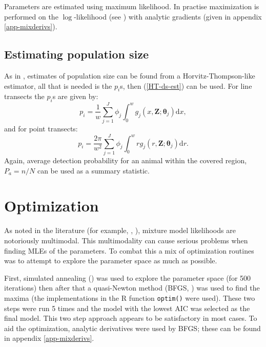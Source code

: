 Parameters are estimated using maximum likelihood. In practise maximization is performed on the $\log$-likelihood (see ) with analytic gradients (given in appendix \ref{app-mixderivs}).



\subsection{Estimating population size}

As in , estimates of population size can be found from a Horvitz-Thompson-like estimator, all that is needed is the $p_i$s, then (\ref{HT-ds-est}) can be used. For line transects the $p_i$s are given by:
\begin{equation*}
p_i = \frac{1}{w} \sum_{j=1}^J \phi_j \int_0^w  g_j(x,\mathbf{Z}; \bm{\theta}_j) \text{d}x,
\end{equation*}
and for point transects:
\begin{equation*}
p_i = \frac{2\pi}{w^2} \sum_{j=1}^J \phi_j \int_0^w  r g_j(r,\mathbf{Z}; \bm{\theta}_j) \text{d}r.
\end{equation*}
Again, average detection probability for an animal within the covered region, $P_a=n/N$ can be used as a summary statistic.


\section{Optimization}
\label{s:optimization}

As noted in the literature (for example, \cite[463-480]{BDA}, \cite{robert}), mixture model likelihoods are notoriously multimodal. This multimodality can cause serious problems when finding MLEs of the parameters. To combat this a mix of optimization routines was to attempt to explore the parameter space as  much as possible.

First, simulated annealing (\cite[pp. 549-554]{numrec}) was used to explore the parameter space (for 500 iterations) then after that a quasi-Newton method (BFGS, \cite{bfgs}) was used to find the maxima (the implementations in the \textsf{R} function \texttt{optim()} were used). These two steps were run 5 times and the model with the lowest AIC was selected as the final model. This two step approach appears to be satisfactory in most cases. To aid the optimization, analytic derivatives were used by BFGS; these can be found in appendix \ref{app-mixderivs}.

